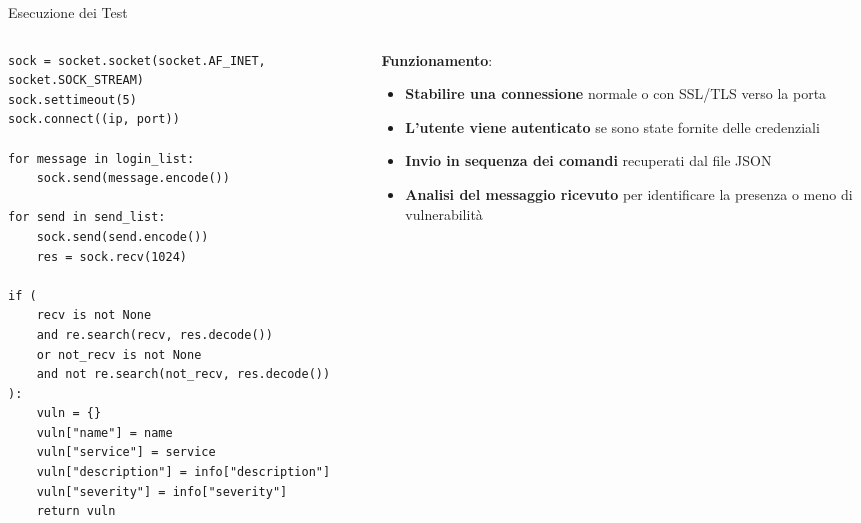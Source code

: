 \begin{frame}[fragile]{Esecuzione dei Test}
\begin{columns}
\begin{column}{0.55\textwidth}
\begin{lstlisting}[style=statalepython, basicstyle=\tiny]
sock = socket.socket(socket.AF_INET, socket.SOCK_STREAM)
sock.settimeout(5)
sock.connect((ip, port))

for message in login_list:
    sock.send(message.encode())

for send in send_list:
    sock.send(send.encode())
    res = sock.recv(1024)

if (
    recv is not None
    and re.search(recv, res.decode())
    or not_recv is not None
    and not re.search(not_recv, res.decode())
):
    vuln = {}
    vuln["name"] = name
    vuln["service"] = service
    vuln["description"] = info["description"]
    vuln["severity"] = info["severity"]
    return vuln
\end{lstlisting}
\end{column}
\begin{column}{0.45\textwidth}
\textbf{Funzionamento}:
\begin{itemize}
    \item \textbf{Stabilire una connessione} normale o con SSL/TLS verso la porta
    \item \textbf{L'utente viene autenticato} se sono state fornite delle credenziali
    \item \textbf{Invio in sequenza dei comandi} recuperati dal file JSON
    \item \textbf{Analisi del messaggio ricevuto} per identificare la presenza o meno di vulnerabilità
\end{itemize}
\end{column}
\end{columns}
\end{frame}


